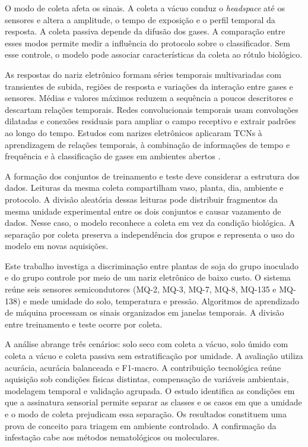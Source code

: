 O modo de coleta afeta os sinais. A coleta a vácuo conduz o \textit{headspace} até os sensores e altera a amplitude, o tempo de exposição e o perfil temporal da resposta. A coleta passiva depende da difusão dos gases. A comparação entre esses modos permite medir a influência do protocolo sobre o classificador. Sem esse controle, o modelo pode associar características da coleta ao rótulo biológico.

As respostas do nariz eletrônico formam séries temporais multivariadas com transientes de subida, regiões de resposta e variações da interação entre gases e sensores. Médias e valores máximos reduzem a sequência a poucos descritores e descartam relações temporais. Redes convolucionais temporais usam convoluções dilatadas e conexões residuais para ampliar o campo receptivo e extrair padrões ao longo do tempo. Estudos com narizes eletrônicos aplicaram TCNs à aprendizagem de relações temporais, à combinação de informações de tempo e frequência e à classificação de gases em ambientes abertos \cite{ma2024tftcn,ma2024msetcn}.

A formação dos conjuntos de treinamento e teste deve considerar a estrutura dos dados. Leituras da mesma coleta compartilham vaso, planta, dia, ambiente e protocolo. A divisão aleatória dessas leituras pode distribuir fragmentos da mesma unidade experimental entre os dois conjuntos e causar vazamento de dados. Nesse caso, o modelo reconhece a coleta em vez da condição biológica. A separação por coleta preserva a independência dos grupos e representa o uso do modelo em novas aquisições.

Este trabalho investiga a discriminação entre plantas de soja do grupo inoculado e do grupo controle por meio de um nariz eletrônico de baixo custo. O sistema reúne seis sensores semicondutores (MQ-2, MQ-3, MQ-7, MQ-8, MQ-135 e MQ-138) e mede umidade do solo, temperatura e pressão. Algoritmos de aprendizado de máquina processam os sinais organizados em janelas temporais. A divisão entre treinamento e teste ocorre por coleta.

A análise abrange três cenários: solo seco com coleta a vácuo, solo úmido com coleta a vácuo e coleta passiva sem estratificação por umidade. A avaliação utiliza acurácia, acurácia balanceada e F1-macro. A contribuição tecnológica reúne aquisição sob condições físicas distintas, compensação de variáveis ambientais, modelagem temporal e validação agrupada. O estudo identifica as condições em que a assinatura sensorial permite separar as classes e os casos em que a umidade e o modo de coleta prejudicam essa separação. Os resultados constituem uma prova de conceito para triagem em ambiente controlado. A confirmação da infestação cabe aos métodos nematológicos ou moleculares.
